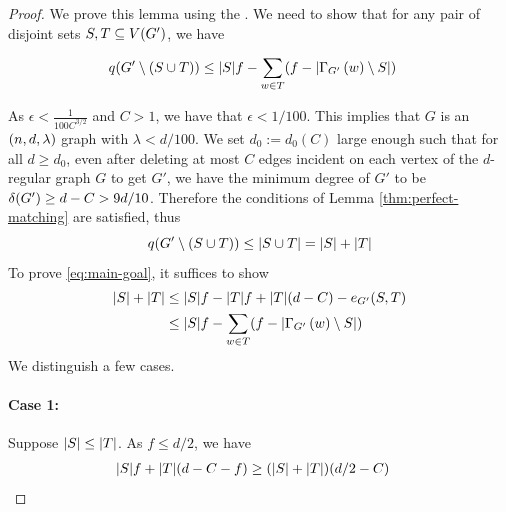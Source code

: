 \documentclass[11pt]{article}
\begin{document}
\begin{proof}
  We prove this lemma using the .
  We need to show that for any pair of disjoint sets $S, T \subseteq \Vertices{G'}$, we have

  \begin{align}
    \OddComponents{G' \setminus (S \cup T)} &\le \Size{S}f - \sum_{w \in T} (f - \Size{\Neighbourhood{G'}{w} \setminus S}) \label{eq:main-goal}
  \end{align}

  As $\epsilon < \frac{1}{100C^{3/2}}$ and $C > 1$, we have that $\epsilon < 1/100$. 
This implies that $G$ is an $\EnDeeLambda$ graph with $\lambda < d/100$.
We set $d_0 := d_0(C)$ large enough such that for all $d \ge d_0$, even after deleting at most $C$ edges incident on each vertex of the $d$-regular graph $G$ to get $G'$, we have the minimum degree of $G'$ to be $\MinimalDegree{G'} \ge  d - C > 9d/10$.
Therefore the conditions of Lemma \ref{thm:perfect-matching} are satisfied,
thus
$$\OddComponents{G' \setminus (S \cup T)} \le \Size{S \cup T} = |S| + |T|$$
To prove \eqref{eq:main-goal}, it suffices to show 
  \begin{align}
    |S| + |T|  &\le \Size{S}f - \Size{T}f + \Size{T}(d-C) - \CutEdges{S}{T}{G'}  \label{eq:to-show}  \\ 
    &\le |S|f - \sum_{w \in T} (f - \Size{\Neighbourhood{G'}{w} \setminus S}) \nonumber
  \end{align}  
We distinguish a few cases.

  \paragraph{Case 1:} Suppose $\Size{S} \leq \Size{T}$. As $f \leq d/2$, we have 
  \begin{align}
    \Size{S}f + \Size{T}(d-C-f)  &\ge (\Size{S} + \Size{T})(d/2 -C) \label{eq:to-show-1}
  \end{align}


\end{proof}
\end{document}
